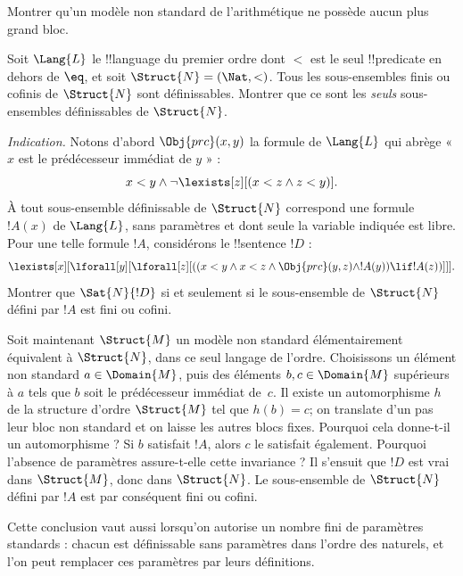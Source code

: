 \documentclass[../../../include/open-logic-section]{subfiles}
\begin{document}
\begin{prob}
Montrer qu'un modèle non standard de l'arithmétique ne possède
aucun plus grand bloc.
\end{prob}

\begin{prob}
Soit $\Lang{L}$ le !!{language} du premier ordre dont $<$ est
le seul !!{predicate} en dehors de $\eq$, et soit
$\Struct{N} = (\Nat, <)$. Tous les sous-ensembles finis ou
cofinis de $\Struct{N}$ sont définissables. Montrer que ce sont
les \emph{seuls} sous-ensembles définissables de $\Struct{N}$.

\emph{Indication.}
Notons d'abord $\Obj{prc}(x,y)$ la formule de $\Lang{L}$ qui
abrège « $x$ est le prédécesseur immédiat de $y$ » :
\[
x<y \land \lnot \lexists[z][(x<z \land z < y)].
\]
À tout sous-ensemble définissable de $\Struct{N}$ correspond
une formule $!A(x)$ de $\Lang{L}$, sans paramètres et dont seule
la variable indiquée est libre. Pour une telle formule $!A$,
considérons le !!{sentence} $!D$ :
\[
\lexists[x][\lforall[y][\lforall[z][((x<y \land x<z \land \Obj{prc}(y,z)
  \land !A(y)) \lif !A(z))]]].
\]
Montrer que $\Sat{N}{!D}$ si et seulement si le sous-ensemble de
$\Struct{N}$ défini par $!A$ est fini ou cofini.

Soit maintenant $\Struct{M}$ un modèle non standard élémentairement
équivalent à $\Struct{N}$, dans ce seul langage de l'ordre.
Choisissons un élément non standard $a \in \Domain{M}$, puis
des éléments $b, c \in \Domain{M}$ supérieurs à $a$ tels que
$b$ soit le prédécesseur immédiat de~$c$.
Il existe un automorphisme $h$ de la structure d'ordre
$\Struct{M}$ tel que $h(b)=c$; on translate d'un pas leur bloc
non standard et on laisse les autres blocs fixes. Pourquoi
cela donne-t-il un automorphisme ?
Si $b$ satisfait $!A$, alors $c$ le satisfait également.
Pourquoi l'absence de paramètres assure-t-elle cette invariance ?
Il s'ensuit que $!D$ est vrai dans $\Struct{M}$, donc dans
$\Struct{N}$. Le sous-ensemble de $\Struct{N}$ défini par $!A$
est par conséquent fini ou cofini.

Cette conclusion vaut aussi lorsqu'on autorise un nombre fini de
paramètres standards : chacun est définissable sans paramètres
dans l'ordre des naturels, et l'on peut remplacer ces paramètres
par leurs définitions.
\end{prob}
\end{document}
